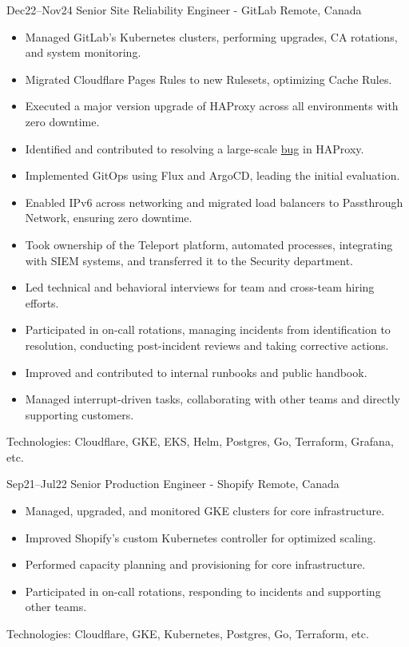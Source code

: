 \documentclass[]{cv-style}                     %
\begin{document}
\begin{entrylist}

  \entry
  {\small Dec22--Nov24}
  {Senior Site Reliability Engineer - GitLab}
  {Remote, Canada}
  {
    \begin{itemize}
      \item Managed GitLab's Kubernetes clusters, performing upgrades, CA rotations, and system monitoring.
      \item Migrated Cloudflare Pages Rules to new Rulesets, optimizing Cache Rules.
      \item Executed a major version upgrade of HAProxy across all environments with zero downtime.
      \item Identified and contributed to resolving a large-scale \href{https://github.com/haproxy/haproxy/issues/2262}{bug} in HAProxy.
      \item Implemented GitOps using Flux and ArgoCD, leading the initial evaluation.
      \item Enabled IPv6 across networking and migrated load balancers to Passthrough Network, ensuring zero downtime.
      \item Took ownership of the Teleport platform, automated processes, integrating with SIEM systems, and transferred it to the Security department.
      \item Led technical and behavioral interviews for team and cross-team hiring efforts.
      \item Participated in on-call rotations, managing incidents from identification to resolution, conducting post-incident reviews and taking corrective actions.
      \item Improved and contributed to internal runbooks and public handbook.
      \item Managed interrupt-driven tasks, collaborating with other teams and directly supporting customers.
    \end{itemize}
    Technologies: Cloudflare, GKE, EKS, Helm, Postgres, Go, Terraform, Grafana, etc.
  }

  \entry
  {\small Sep21--Jul22}
  {Senior Production Engineer - Shopify}
  {Remote, Canada}
  {
    \begin{itemize}
      \item Managed, upgraded, and monitored GKE clusters for core infrastructure.
      \item Improved Shopify’s custom Kubernetes controller for optimized scaling.
      \item Performed capacity planning and provisioning for core infrastructure.
      \item Participated in on-call rotations, responding to incidents and supporting other teams.
    \end{itemize}
    Technologies: Cloudflare, GKE, Kubernetes, Postgres, Go, Terraform, etc.
  }


\end{entrylist}
\end{document}
